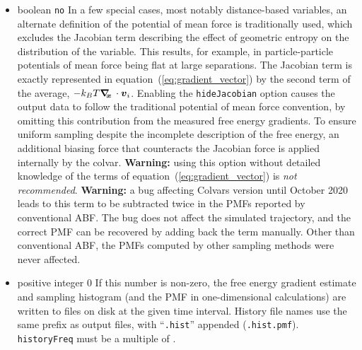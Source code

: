 \begin{itemize}
\item {}
  {boolean}
  {\texttt{no}}
  {In a few special cases, most notably distance-based variables, an alternate definition of
    the potential of mean force is traditionally used, which excludes the Jacobian
    term describing the effect of geometric entropy on the distribution of the variable.
    This results, for example, in particle-particle potentials of mean force being flat
    at large separations.
    The Jacobian term is exactly represented in equation~(\ref{eq:gradient_vector}) by the second term
    of the average, $ - k_B T \mbox{\boldmath$\nabla_{\!\!x}\,$} \cdot {\mbox{\boldmath{$v$}}}_{i} $.
    Enabling the \texttt{hideJacobian} option causes the output data to follow the traditional
    potential of mean force convention,
    by omitting this contribution from the measured free energy gradients.
    To ensure uniform sampling despite the incomplete description of the free energy, an
    additional biasing force that counteracts the Jacobian force is applied internally by the
    colvar.
    \textbf{Warning:} using this option without detailed knowledge of the terms of equation~(\ref{eq:gradient_vector}) is \emph{not recommended}.
    \textbf{Warning:} a bug affecting Colvars version until October 2020 leads to this term to be subtracted twice in the PMFs reported by conventional ABF.
    The bug does not affect the simulated trajectory, and the correct PMF can be recovered by adding back the term manually.
    Other than conventional ABF, the PMFs computed by other sampling methods were never affected.}

\item {}
  {positive integer}
  {0}
  {If this number is non-zero, the free energy gradient estimate and sampling histogram
    (and the PMF in one-dimensional calculations) are written to files on disk at
    the given time interval. History file names use the same prefix as output files, with
    ``\texttt{.hist}'' appended (\outputName\texttt{.hist.pmf}).
  \texttt{historyFreq} must be a multiple of .}


\end{itemize}
